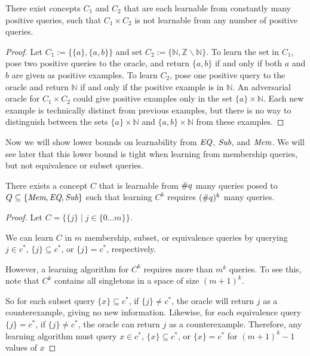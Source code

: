 \documentclass[11pt]{amsart}
\begin{document}
\begin{proposition}
There exist concepts $C_1$ and $C_2$ that are each learnable from constantly many positive queries, such that $C_1 \times C_2$ is not learnable from any number of positive queries. 
\end{proposition}
\begin{proof}
Let $C_1 := \{ \{a\}, \{a,b\} \}$ and set $C_2 := \{ \mathbb{N}, \mathbb{Z} \backslash \mathbb{N} \}$. 
To learn the set in $C_1$, pose two positive queries to the oracle, and return $\{a,b\}$ if and only if both $a$ and $b$ are given as positive examples. 
To learn $C_2$, pose one positive query to the oracle and return $\mathbb{N}$ if and only if the positive example is in $\mathbb{N}$. 
An adversarial oracle for $C_1 \times C_2$ could give positive examples only in the set $\{a\} \times \mathbb{N}$. 
Each new example is technically distinct from previous examples, but there is no way to distinguish between the sets $\{a\}\times \mathbb{N}$ and $\{a,b\} \times \mathbb{N}$ from these examples. 
\end{proof}

Now we will show lower bounds on learnability from $\emph{EQ}$, $\emph{Sub}$, and $\emph{Mem}$. 
We will see later that this lower bound is tight when learning from membership queries, but not equivalence or subset queries.


\begin{proposition}
There exists a concept $C$ that is learnable from $\#q$ many queries posed to $Q \subseteq \{ \emph{Mem}, \emph{EQ}, \emph{Sub} \}$ such that learning $C^k$ requires $(\#q)^k$ many queries.   
\end{proposition}
\begin{proof}
Let $C = \{ \{j\} \mid j \in \{0 \dots m\} \}$. 

We can learn $C$ in $m$ membership, subset, or equivalence queries by querying $j \in c^*$, $\{ j \} \subseteq c^*$, or $\{j\} = c^*$, respectively. 

However, a learning algorithm for $C^k$ requires more than $m^k$ queries. 
To see this, note that  $C^k$ contains all singletons in a space of size $(m+1)^k$. 

So for each subset query $\{x\} \subseteq c^*$, if $\{j\} \ne c^*$, the oracle will return $j$ as a counterexample, giving no new information.  
Likewise, for each equivalence query $\{j\} = c^*$, if $\{j\} \ne c^*$, the oracle can return $j$ as a counterexample.
Therefore, any learning algorithm must query $x \in c^*$, $\{ x \} \subseteq c^*$, or $\{x\} = c^*$ for $(m+1)^k - 1$ values of $x$
\end{proof}
\end{document}
